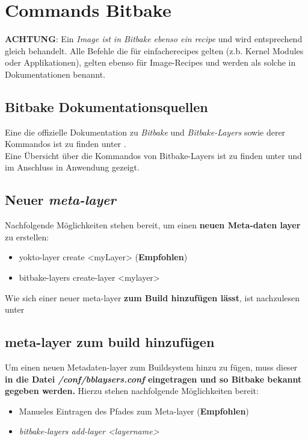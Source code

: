 \chapter{Commands Bitbake}%
\label{cha:commands_bitbake}

\textbf{ACHTUNG}: Ein \textit{Image ist in  Bitbake ebenso
ein \textit{recipe}} und wird entsprechend gleich behandelt. Alle Befehle die
für \glq einfache\grq recipes gelten (z.b. Kernel Modules oder Applikationen),
gelten ebenso für Image-Recipes und werden als solche in Dokumentationen benannt.


\section{Bitbake Dokumentationsquellen}%
\label{sec:bitbake_quellen}
Eine die offizielle Dokumentation zu \textit{Bitbake} und
\textit{Bitbake-Layers} sowie derer Kommandos ist zu finden unter
\cite{Yocto:Bitbake_Manual}.
\\
Eine Übersicht über die Kommandos von Bitbake-Layers  ist zu finden unter
\cite[156]{Gonzalez2018:Embedded_Linux_Development_Using_Yocto_Project_Cookbook_2nd}
und im Anschluss in Anwendung gezeigt.


\section{Neuer \textit{meta-layer}}%
\label{sec:_a_new_recipes}
Nachfolgende Möglichkeiten stehen bereit, um einen \textbf{neuen Meta-daten
layer} zu erstellen:
\begin{itemize}
    \item yokto-layer create <myLayer> (\textbf{Empfohlen})
    \item bitbake-layers create-layer <mylayer>
\end{itemize}

Wie sich einer neuer meta-layer \textbf{zum Build hinzufügen lässt}, ist
nachzulesen unter 

\section{meta-layer zum build hinzufügen}%
\label{sec:meta_layer_zum_build_hinzufugen}
Um einen neuen Metadaten-layer zum Buildsystem hinzu zu fügen, muss dieser
\textbf{ in die Datei \textit{/conf/bblaysers.conf} eingetragen und so Bitbake
bekannt gegeben werden.} Hierzu stehen nachfolgende Möglichkeiten bereit:
\begin{itemize}
    \item Manueles Eintragen des Pfades zum Meta-layer (\textbf{Empfohlen})
    \item \textit{bitbake-layers add-layer <layername>}
\end{itemize}



